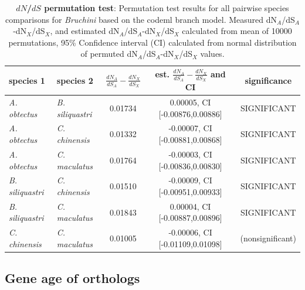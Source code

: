 \documentclass{article}
\begin{document}
\begin{table}[H]
    \centering
    \caption{\textbf{$dN$/$dS$ permutation test}: Permutation test results for all pairwise species comparisons for \textit{Bruchini} based on the codeml branch model. 
    Measured dN$_A$/dS$_A$-dN$_X$/dS$_X$, and estimated dN$_A$/dS$_A$-dN$_X$/dS$_X$ calculated from mean of
    10000 permutations, 95\% Confidence interval (CI) calculated from normal distribution of permuted dN$_A$/dS$_A$-dN$_X$/dS$_X$ values.}
    \label{SItab:BUSCO}
    \begin{tabular}{l | l | c |c | c}
        species 1  & species 2 & $\frac{dN_A}{dS_A}-\frac{dN_X}{dS_X}$ & est. $\frac{dN_A}{dS_A}-\frac{dN_X}{dS_X}$ and CI & significance \\
        \hline
        \hline	 
        \textit{A. obtectus} & \textit{B. siliquastri} & 0.01734 &  0.00005, CI [-0.00876,0.00886] & SIGNIFICANT \\
        \hline
        \textit{A. obtectus} & \textit{C. chinensis} & 0.01332 & -0.00007, CI [-0.00881,0.00868] & SIGNIFICANT \\
        \hline
        \textit{A. obtectus} & \textit{C. maculatus} & 0.01764 & -0.00003, CI [-0.00836,0.00830] & SIGNIFICANT \\
        \hline
        \textit{B. siliquastri} & \textit{C. chinensis} & 0.01510 & -0.00009, CI [-0.00951,0.00933] & SIGNIFICANT \\
        \hline
        \textit{B. siliquastri} & \textit{C. maculatus} & 0.01843 &  0.00004, CI [-0.00887,0.00896] & SIGNIFICANT \\
        \hline
        \textit{C. chinensis} & \textit{C. maculatus} & 0.01005 & -0.00006, CI [-0.01109,0.01098] & (nonsignificant) \\
        \hline
    \end{tabular}
\end{table}



\subsection*{Gene age of orthologs}
\end{document}
